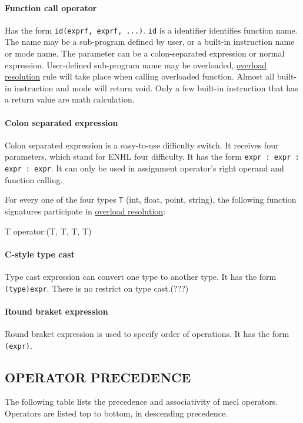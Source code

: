 \documentclass{article}
\begin{document}
\paragraph{Function call operator} Has the form \verb|id(exprf, exprf, ...)|. \verb|id| is a identifier identifies function name. The name may be a sub-program defined by user, or a built-in instruction name or mode name. The parameter can be a colon-separated expression or normal expression. User-defined sub-program name may be overloaded, \hyperref[chongzai]{overload resolution} rule will take place when calling overloaded function. Almost all built-in instruction and mode will return void. Only a few built-in instruction that has a return value are math calculation.

\paragraph{Colon separated expression} Colon separated expression is a easy-to-use difficulty switch. It receives four parameters, which stand for ENHL four difficulty. It has the form \verb|expr : expr : expr : expr|. It can only be used in assignment operator's right operand and function calling.

For every one of the four types \verb|T| (int, float, point, string), the following function signatures participate in \hyperref[chongzai]{overload resolution}:
\begin{MUAvbt}
T operator:(T, T, T, T)
\end{MUAvbt}

\paragraph{C-style type cast} Type cast expression can convert one type to another type. It has the form \verb|(type)expr|. There is no restrict on type cast.(???)

\paragraph{Round braket expression} Round braket expression is used to specify order of operations. It has the form \verb|(expr)|.

\subsection{OPERATOR PRECEDENCE}

The following table lists the precedence and associativity of mecl operators. Operators are listed top to bottom, in descending precedence.
\end{document}
